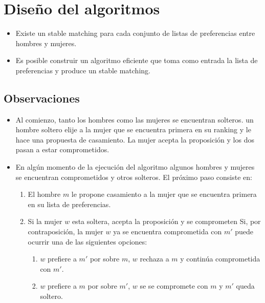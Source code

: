 \documentclass[12pt, fleqn]{article}
\theoremstyle{remark}
\theoremstyle{definition}
\begin{document}
\section{Diseño del algoritmos}
\begin{itemize}
    \item Existe un stable matching para cada conjunto de listas de preferencias entre
            hombres y mujeres.
    \item Es posible construir un algoritmo eficiente que toma como entrada 
            la lista de preferencias y produce un stable matching.
\end{itemize}
\subsection{Observaciones}
\begin{itemize}
    \item Al comienzo, tanto los hombres como las mujeres se encuentran solteros.
            un hombre soltero elije a la mujer que se encuentra primera en su ranking
            y le hace una propuesta de casamiento.
            La mujer acepta la proposición y los dos pasan a estar comprometidos.
    \item En algún momento de la ejecución del algoritmo algunos hombres y mujeres
            se encuentran comprometidos y otros solteros. El próximo paso consiste en:
            \begin{enumerate}
                \item El hombre $m$ le propone casamiento a la mujer que se encuentra
                        primera en su lista de preferencias.
                \item Si la mujer $w$ esta soltera, acepta la proposición y se comprometen
                        Si, por contraposición, la mujer $w$ ya se encuentra comprometida
                        con $m'$ puede ocurrir una de las siguientes opciones:
                        \begin{enumerate}
                            \item $w$ prefiere a $m'$ por sobre $m$, $w$ rechaza
                                    a $m$ y continúa comprometida con $m'$.
                            \item $w$ prefiere a $m$ por sobre $m'$, $w$ se
                                    se compromete con $m$ y $m'$ queda soltero.        
                        \end{enumerate}
            \end{enumerate}
\end{itemize}
\end{document}
